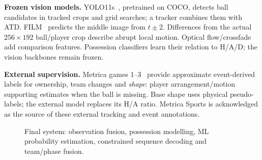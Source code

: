 \documentclass[conference,a4paper,10pt]{IEEEtran}
\begin{document}
\textbf{Frozen vision models.} YOLO11s~\cite{yolo}, pretrained on COCO, detects
ball candidates in tracked crops and grid searches; a tracker combines them
with ATD. FILM~\cite{film} predicts the middle image from $t\pm2$. Differences
from the actual $256\times192$ ball/player crop describe abrupt local motion.
Optical flow/crossfade add comparison features. Possession classifiers learn
their relation to H/A/D; the vision backbones remain frozen.

\textbf{External supervision.} Metrica games 1--3~\cite{metrica} provide
approximate event-derived labels for ownership, team changes and \emph{shape}:
player arrangement/motion supporting estimates when the ball is missing.
Base shape uses physical pseudo-labels; the external model replaces its H/A
ratio. Metrica Sports is acknowledged as the source of these external
tracking and event annotations.

\begin{figure}[!t]
\centering
{}
\caption{Final system: observation fusion, possession modelling, ML probability
estimation, constrained sequence decoding and team/phase fusion.}
\label{fig:pipeline}
\end{figure}
\end{document}
